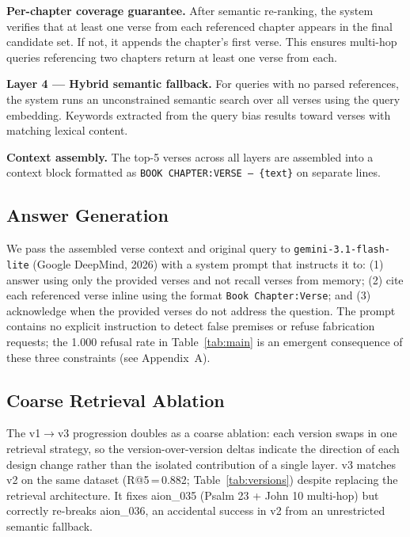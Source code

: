 \documentclass[11pt]{article}
\begin{document}
\textbf{Per-chapter coverage guarantee.} After semantic re-ranking, the system verifies that at least one verse from each referenced chapter appears in the final candidate set. If not, it appends the chapter's first verse. This ensures multi-hop queries referencing two chapters return at least one verse from each.

\textbf{Layer 4 --- Hybrid semantic fallback.} For queries with no parsed references, the system runs an unconstrained semantic search over all verses using the query embedding. Keywords extracted from the query bias results toward verses with matching lexical content.

\textbf{Context assembly.} The top-5 verses across all layers are assembled into a context block formatted as \texttt{BOOK CHAPTER:VERSE --- \{text\}} on separate lines.

\subsection{Answer Generation}

We pass the assembled verse context and original query to \texttt{gemini-3.1-flash-lite} (Google DeepMind, 2026) with a system prompt that instructs it to: (1) answer using only the provided verses and not recall verses from memory; (2) cite each referenced verse inline using the format \texttt{Book Chapter:Verse}; and (3) acknowledge when the provided verses do not address the question. The prompt contains no explicit instruction to detect false premises or refuse fabrication requests; the 1.000 refusal rate in Table~\ref{tab:main} is an emergent consequence of these three constraints (see Appendix~A).

\subsection{Coarse Retrieval Ablation}

The v1$\rightarrow$v3 progression doubles as a coarse ablation: each version swaps in one retrieval strategy, so the version-over-version deltas indicate the direction of each design change rather than the isolated contribution of a single layer.
v3 matches v2 on the same dataset (R@5\,=\,0.882; Table~\ref{tab:versions}) despite replacing the retrieval architecture.
It fixes aion\_035 (Psalm 23 + John 10 multi-hop) but correctly re-breaks aion\_036, an accidental success in v2 from an unrestricted semantic fallback.
\end{document}
